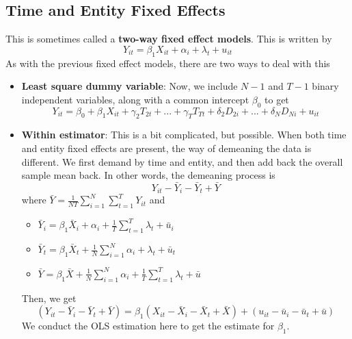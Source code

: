 \subsection{Time and Entity Fixed Effects}
This is sometimes called a \textbf{two-way fixed effect models}. This is written by
\[
Y_{it}=\beta_1 X_{it} + \alpha_i +\lambda_t + u_{it}
\]
As with the previous fixed effect models, there are two ways to deal with this
\begin{itemize}
\item \textbf{Least square dummy variable}: Now, we include $N-1$ and $T-1$ binary independent variables, along with a common intercept $\beta_0$ to get
\[
Y_{it} = \beta_0 +\beta_1X_{it}+\gamma_2T_{2t}+...+\gamma_TT_{Tt}+\delta_2D_{2i} + ... + \delta_ND_{Ni}+u_{it} 
\]
\item \textbf{Within estimator}: This is a bit complicated, but possible. When both time and entity fixed effects are present, the way of demeaning the data is different. We first demand by time and entity, and then add back the overall sample mean back. In other words, the demeaning process is 
\[
Y_{it}-\bar{Y}_i -\bar{Y}_t +\bar{Y}
\]
where $\bar{Y} = \frac{1}{NT}\sum_{i=1}^N \sum_{t=1}^TY_{it}$ and 
\begin{itemize}
\item $\bar{Y}_i = \beta_1 \bar{X}_i +\alpha_i +\frac{1}{T}\sum_{t=1}^T\lambda_t+\bar{u}_i$
\item $\bar{Y}_t = \beta_1 \bar{X}_t +\frac{1}{N}\sum_{i=1}^N\alpha_i +\lambda_t+\bar{u}_t$
\item $\bar{Y}  =\beta_1\bar{X}+\frac{1}{N}\sum_{i=1}^N\alpha_i+\frac{1}{T}\sum_{t=1}^T\lambda_t+\bar{u}$
\end{itemize}
Then, we get
\[
(Y_{it}-\bar{Y}_i -\bar{Y}_t +\bar{Y}) = \beta_1(X_{it}-\bar{X}_i -\bar{X}_t +\bar{X}) + (u_{it}-\bar{u}_i -\bar{u}_t +\bar{u})
\]
We conduct the OLS estimation here to get the estimate for $\beta_1$. 
\end{itemize}
